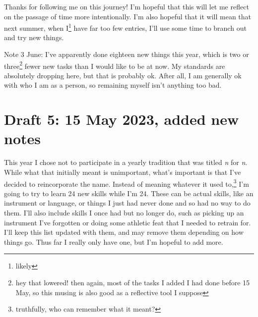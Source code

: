 \documentclass[12pt]{article}[titlepage]
\newcommand{\1}{\={a}}
\newcommand{\2}{\={e}}
\newcommand{\3}{\={\i}}
\newcommand{\4}{\=o}
\newcommand{\5}{\=u}
\newcommand{\6}{\={A}}
\renewcommand{\,}{\textsuperscript{,}}
\begin{document}
Thanks for following me on this journey!
I'm hopeful that this will let me reflect on the passage of time more intentionally.
I'm also hopeful that it will mean that next summer, when I\footnote{likely} have far too few entries, I'll use some time to branch out and try new things.

Note 3 June: 
I've apparently done eighteen new things this year, which is two or three\footnote{hey that lowered! then again, most of the tasks I added I had done before 15 May, so this musing is also good as a reflective tool I suppose} fewer new tasks than I would like to be at now.
My standards are absolutely dropping here, but that is probably ok.
After all, I am generally ok with who I am as a person, so remaining myself isn't anything too bad.


\section{Draft 5: 15 May 2023, added new notes}
This year I chose not to participate in a yearly tradition that was titled \textit{n} for \textit{n}.
While what that initially meant is unimportant, what's important is that I've decided to reincorporate the name.
Instead of meaning whatever it used to,\footnote{truthfully, who can remember what it meant?} I'm going to try to learn 24 new skills while I'm 24.
These can be actual skills, like an instrument or language, or things I just had never done and so had no way to do them.
I'll also include skills I once had but no longer do, such as picking up an instrument I've forgotten or doing some athletic feat that I needed to retrain for.
I'll keep this list updated with them, and may remove them depending on how things go.
Thus far I really only have one, but I'm hopeful to add more.
\end{document}
